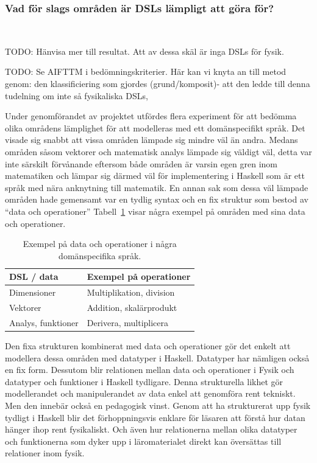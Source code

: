 \begin{draft}
\subsubsection{Vad för slags områden är DSLs lämpligt att göra
för?}~\label{sec:lampligt}

TODO: Hänvisa mer till resultat. Att av dessa skäl är inga DSLs för fysik.

TODO: Se AIFTTM i bedömningskriterier. Här kan vi knyta an till metod genom: den
klassificiering som gjordes (grund/komposit)- att den ledde till denna tudelning
om inte så fysikaliska DSLs, 

Under genomförandet av projektet utfördes flera experiment för att bedömma olika
områdens lämplighet för att modelleras med ett domänspecifikt språk. Det visade
sig snabbt att vissa områden lämpade sig mindre väl än andra. Medans områden
såsom vektorer och matematisk analys lämpade sig väldigt väl, detta var inte
särskilt förvånande eftersom både områden är varsin egen gren inom matematiken
och lämpar sig därmed väl för implementering i Haskell som är ett språk med nära
anknytning till matematik. En annan sak som dessa väl lämpade områden hade
gemensamt var en tydlig syntax och en fix struktur som bestod av ``data och
operationer'' Tabell~\ref{tab:data_och_ops} visar några exempel på områden med
sina data och operationer.

\begin{table}[tph]
\centering
\caption{Exempel på data och operationer i några domänspecifika språk.}
\label{tab:data_och_ops}
\begin{tabular}{@{}l|l@{}}
\toprule
DSL / data & Exempel på operationer \\ \midrule
Dimensioner & Multiplikation, division \\
Vektorer & Addition, skalärprodukt \\
Analys, funktioner & Derivera, multiplicera \\ \bottomrule
\end{tabular}
\end{table}

Den fixa strukturen kombinerat med data och operationer gör det enkelt att
modellera dessa områden med datatyper i Haskell. Datatyper har nämligen också en
fix form. Dessutom blir relationen mellan data och operationer i Fysik och
datatyper och funktioner i Haskell tydligare. Denna strukturella likhet gör
modellerandet och manipulerandet av data enkel att genomföra rent tekniskt. Men
den innebär också en pedagogisk vinst. Genom att ha strukturerat upp fysik
tydligt i Haskell blir det förhoppningsvis enklare för läsaren att förstå hur
datan hänger ihop rent fysikaliskt. Och även hur relationerna mellan olika
datatyper och funktionerna som dyker upp i läromaterialet direkt kan översättas
till relationer inom fysik.


\end{draft}
